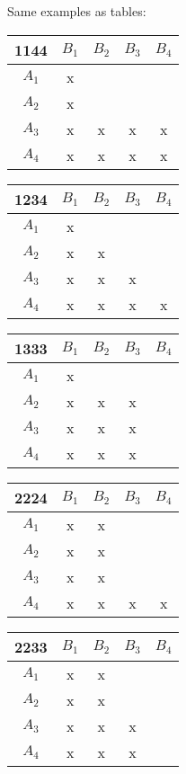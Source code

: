 Same examples as tables:\\
\begin{tabular}{c||c|c|c|c}
1144 & $B_1$ & $B_2$ & $B_3$ & $B_4$ \\\hline\hline
 $A_1$ & x & ~ & ~ & ~ \\
 $A_2$ & x & ~ & ~ & ~ \\
 $A_3$ & x & x & x & x \\
 $A_4$ & x & x & x & x \\
\end{tabular}
\hfill
\begin{tabular}{c||c|c|c|c}
1234 & $B_1$ & $B_2$ & $B_3$ & $B_4$ \\\hline\hline
 $A_1$ & x & ~ & ~ & ~ \\
 $A_2$ & x & x & ~ & ~ \\
 $A_3$ & x & x & x & ~ \\
 $A_4$ & x & x & x & x \\
\end{tabular}
\hfill
\begin{tabular}{c||c|c|c|c}
1333 & $B_1$ & $B_2$ & $B_3$ & $B_4$ \\\hline\hline
 $A_1$ & x & ~ & ~ & ~ \\
 $A_2$ & x & x & x & ~ \\
 $A_3$ & x & x & x & ~ \\
 $A_4$ & x & x & x & ~ \\
\end{tabular}

\begin{tabular}{c||c|c|c|c}
2224 & $B_1$ & $B_2$ & $B_3$ & $B_4$ \\\hline\hline
 $A_1$ & x & x & ~ & ~ \\
 $A_2$ & x & x & ~ & ~ \\
 $A_3$ & x & x & ~ & ~ \\
 $A_4$ & x & x & x & x \\
\end{tabular}
\hfill
\begin{tabular}{c||c|c|c|c}
2233 & $B_1$ & $B_2$ & $B_3$ & $B_4$ \\\hline\hline
 $A_1$ & x & x & ~ & ~ \\
 $A_2$ & x & x & ~ & ~ \\
 $A_3$ & x & x & x & ~ \\
 $A_4$ & x & x & x & ~ \\
\end{tabular}


~


